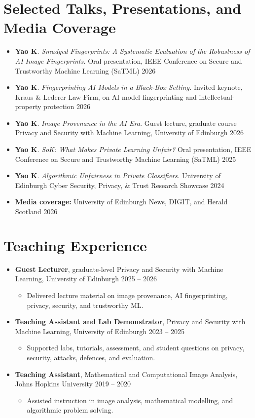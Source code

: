 \documentclass[10pt,a4paper]{article}
\begin{document}
\section*{Selected Talks, Presentations, and Media Coverage}
\begin{itemize}
    \item \textbf{Yao K}. \textit{Smudged Fingerprints: A Systematic Evaluation of the Robustness of AI Image Fingerprints.} Oral presentation, IEEE Conference on Secure and Trustworthy Machine Learning (SaTML) \hfill 2026
    \item \textbf{Yao K}. \textit{Fingerprinting AI Models in a Black-Box Setting.} Invited keynote, Kraus \& Lederer Law Firm, on AI model fingerprinting and intellectual-property protection \hfill 2026
    \item \textbf{Yao K}. \textit{Image Provenance in the AI Era.} Guest lecture, graduate course Privacy and Security with Machine Learning, University of Edinburgh \hfill 2026
    \item \textbf{Yao K}. \textit{SoK: What Makes Private Learning Unfair?} Oral presentation, IEEE Conference on Secure and Trustworthy Machine Learning (SaTML) \hfill 2025
    \item \textbf{Yao K}. \textit{Algorithmic Unfairness in Private Classifiers.} University of Edinburgh Cyber Security, Privacy, \& Trust Research Showcase \hfill 2024
    \item \textbf{Media coverage:} University of Edinburgh News, DIGIT, and Herald Scotland \hfill 2026
\end{itemize}

\section*{Teaching Experience}
\begin{itemize}
    \item \textbf{Guest Lecturer}, graduate-level Privacy and Security with Machine Learning, University of Edinburgh \hfill 2025 -- 2026
    \begin{itemize}
        \item Delivered lecture material on image provenance, AI fingerprinting, privacy, security, and trustworthy ML.
    \end{itemize}
    \item \textbf{Teaching Assistant and Lab Demonstrator}, Privacy and Security with Machine Learning, University of Edinburgh \hfill 2023 -- 2025
    \begin{itemize}
        \item Supported labs, tutorials, assessment, and student questions on privacy, security, attacks, defences, and evaluation.
    \end{itemize}
    \item \textbf{Teaching Assistant}, Mathematical and Computational Image Analysis, Johns Hopkins University \hfill 2019 -- 2020
    \begin{itemize}
        \item Assisted instruction in image analysis, mathematical modelling, and algorithmic problem solving.
    \end{itemize}
\end{itemize}
\end{document}
